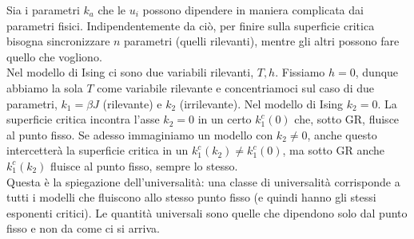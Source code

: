 \documentclass[10pt,a4paper]{report}
\theoremstyle{definition}
\numberwithin{equation}{section}
\begin{document}
Sia i parametri $k_a$ che le $u_i$ possono dipendere in maniera complicata dai parametri fisici. Indipendentemente da ciò, per finire sulla superficie critica bisogna sincronizzare $n$ parametri (quelli rilevanti), mentre gli altri possono fare quello che vogliono. \\
Nel modello di Ising ci sono due variabili rilevanti, $T,h$. Fissiamo $h=0$, dunque abbiamo la sola $T$ come variabile rilevante e concentriamoci sul caso di due parametri, $k_1=\beta J$ (rilevante) e $k_2$ (irrilevante). Nel modello di Ising $k_2=0$. La superficie critica incontra l'asse $k_2=0$ in un certo $k_1^c(0)$ che, sotto GR, fluisce al punto fisso. Se adesso immaginiamo un modello con $k_2\ne 0$, anche questo intercetterà la superficie critica in un $k_1^c(k_2)\ne k_1^c(0)$, ma sotto GR anche $k_1^c(k_2)$ fluisce al punto fisso, sempre lo stesso. \\
Questa è la spiegazione dell'universalità: una classe di universalità corrisponde a tutti i modelli che fluiscono allo stesso punto fisso (e quindi hanno gli stessi esponenti critici). Le quantità universali sono quelle che dipendono solo dal punto fisso e non da come ci si arriva.
\end{document}
